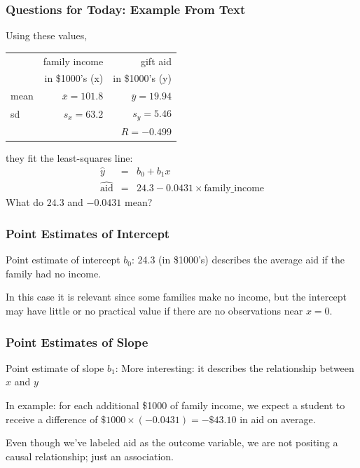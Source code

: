 \documentclass[slides]{beamer}
\newcommand{\blue}[1]{\textcolor{blue2}{#1}}
\begin{document}
\begin{frame}[fragile]
\frametitle{Questions for Today: Example From Text}
Using these values,
\begin{center}
\begin{tabular}{l|rr}
& family income & gift aid \\
& in \$1000's (x) & in \$1000's (y) \\ 
\hline
mean & $\overline{x}=101.8$ & $\overline{y}=19.94$ \\ 
sd & $s_x=63.2$ & $s_y=5.46$ \\ 
\hline
 &  & $R=-0.499$ \\ 
\hline
\end{tabular}
\end{center}
they fit the \blue{least-squares line}:
\pause
\begin{eqnarray*}
\widehat{y} &=& b_0 + b_1 x\\
\widehat{\mbox{aid}} &=& 24.3 - 0.0431 \times \mbox{family\_income}
\end{eqnarray*}
What do $24.3$ and $-0.0431$ mean?

\end{frame}


\begin{frame}[fragile]
\frametitle{Point Estimates of Intercept}
\blue{Point estimate of intercept $b_0$}: 24.3 (in \$1000's) describes the average aid if the family had no income.  

\vspace{0.25cm}
\pause
In this case it is relevant since some families make no income, but the intercept may have little or no practical value if there are no observations near $x=0$.  

\end{frame}


\begin{frame}[fragile]
\frametitle{Point Estimates of Slope}
\blue{Point estimate of slope $b_1$}: More interesting: it describes the \blue{relationship} between $x$ and $y$

\vspace{0.5cm}
\pause
In example: for each additional \$1000 of family income, we \blue{expect} a student to receive a difference of $\$1000 \times (-0.0431) = -\$43.10$ in aid on average.   

\vspace{0.5cm}
\pause
Even though we've labeled aid as the outcome variable, we are not positing a causal relationship; just an association.  


\end{frame}
\end{document}
